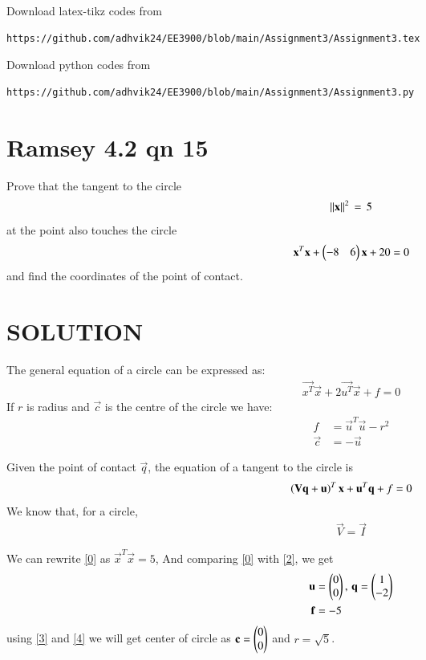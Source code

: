 \documentclass[journal,12pt,twocolumn]{IEEEtran}
\begin{document}
Download latex-tikz codes from 
%
\begin{lstlisting}
https://github.com/adhvik24/EE3900/blob/main/Assignment3/Assignment3.tex
\end{lstlisting}
%
Download python codes from 
%
\begin{lstlisting}
https://github.com/adhvik24/EE3900/blob/main/Assignment3/Assignment3.py
\end{lstlisting}
\section{Ramsey 4.2 qn 15}
Prove that the tangent to the circle 
\begin{align}
    \lVert\mathbf{x}\rVert^2\,=\,5\label{0}
\end{align}
at the point  also touches the circle 
\begin{align}
    \mathbf{x}^T\mathbf{x}+\begin{pmatrix}-8 & 6\end{pmatrix}\mathbf{x}+20 = 0\label{1}
\end{align}
and find the coordinates of the point of
contact.
\section{SOLUTION}
The general equation of a circle can be expressed as:
\begin{align}
\vec{x^T}\vec{x} + 2\vec{u^T}\vec{x} + f = 0 \label{2}
\end{align}
If $r$ is radius and $\vec{c}$ is the centre of the circle we have:
\begin{align}
f &=\vec{u}^T\vec{u}-r^2  \label{3} \\  
\vec{c} &=-\vec{u} \label{4}
\end{align}




Given the point of contact $\vec{q}$, the equation of a tangent to the circle is 
\begin{align}
\left(\mathbf{V}\mathbf{q}+\mathbf{u}\right)^T\mathbf{x}+\mathbf{u}^T\mathbf{q}+f = 0
\label{5}
\end{align}
We know that, for a circle, 
\begin{align}
\vec{V} = \vec{I}  
\end{align}



We can rewrite \eqref{0} as $\vec{x}^T\vec{x} = 5$, And comparing \eqref{0} with \eqref{2}, we get
\begin{align}
    \mathbf{u}&=\begin{pmatrix}0\\0\end{pmatrix},\, \mathbf{q}= \begin{pmatrix}1\\-2\end{pmatrix}\\
    \mathbf{f}&=-5
\end{align}
using \eqref{3} and \eqref{4} we will get center of circle as $\mathbf{c} = \begin{pmatrix}0\\0\end{pmatrix}$ and $r= \sqrt{5}$.
\end{document}
